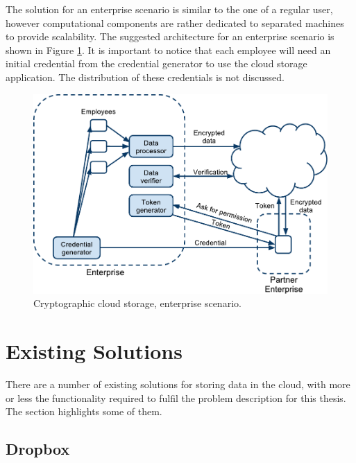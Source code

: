 \documentclass[pdftex,english,10pt,b5paper,twoside]{book}
\begin{document}
The solution for an enterprise scenario is similar to the one of a regular
user, however computational components are rather dedicated to separated
machines to provide scalability. The suggested architecture for an enterprise
scenario is shown in Figure \ref{fig:RW:CCS:EA}. It is important to notice that
each employee will need an initial credential from the credential generator to
use the cloud storage application. The distribution of these credentials is not
discussed.

\begin{figure}[h!]
    \centering
    \includegraphics[scale=0.6]{ArchitectureCCSE.pdf}
    \caption{Cryptographic cloud storage, enterprise scenario.}
    \label{fig:RW:CCS:EA}
\end{figure}


\section{Existing Solutions}
\label{sec:existing}

There are a number of existing solutions for storing data in the cloud,
with more or less the functionality required to fulfil the problem
description for this thesis. The section highlights some of them.

\subsection{Dropbox}
\end{document}
